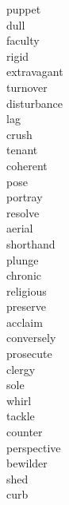 \documentclass[b5paper, 11pt]{ctexart}
\begin{document}
\begin{multicols*}{3}
\begin{description}
\item[puppet]

\item[dull]

\item[faculty]

\item[rigid]

\item[extravagant]

\item[turnover]

\item[disturbance]

\item[lag]

\item[crush]

\item[tenant]

\item[coherent]

\item[pose]

\item[portray]

\item[resolve]

\item[aerial]

\item[shorthand]

\item[plunge]

\item[chronic]

\item[religious]

\item[preserve]

\item[acclaim]

\item[conversely]

\item[prosecute]

\item[clergy]

\item[sole]

\item[whirl]

\item[tackle]

\item[counter]

\item[perspective]

\item[bewilder]

\item[shed]

\item[curb]

    \end{description}
\end{multicols*}
\end{document}
